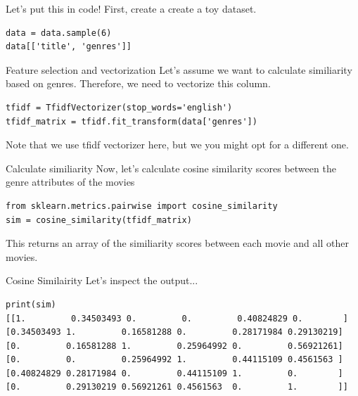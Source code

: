 \documentclass[handout]{beamer}
\begin{document}
\begin{frame}[fragile]{Let's put this in code!}
	\pause
	First, create a create a toy dataset.
	\pause
	\begin{verbatim}
data = data.sample(6)
data[['title', 'genres']]
	\end{verbatim}
	\pause
\end{frame}

\begin{frame}[fragile]{Feature selection and vectorization}
	Let's assume we want to calculate similiarity based on genres. Therefore, we need to vectorize this column. 
	\begin{verbatim}
tfidf = TfidfVectorizer(stop_words='english')
tfidf_matrix = tfidf.fit_transform(data['genres'])
	\end{verbatim}
	\pause
Note that we use \alert{tfidf vectorizer} here, but we you might opt for a different one. 
\end{frame}

\begin{frame}[fragile]{Calculate similiarity}
	Now, let's calculate cosine similarity scores between the genre attributes of the movies
	\begin{verbatim}
from sklearn.metrics.pairwise import cosine_similarity
sim = cosine_similarity(tfidf_matrix)
	\end{verbatim}
	\pause
This returns an array of the similiarity scores between each movie and all other movies. 
\end{frame}

\begin{frame}[fragile]{Cosine Similairity}
	Let's inspect the output...
\begin{verbatim}
print(sim)
[[1.         0.34503493 0.         0.         0.40824829 0.        ]
[0.34503493 1.         0.16581288 0.         0.28171984 0.29130219]
[0.         0.16581288 1.         0.25964992 0.         0.56921261]
[0.         0.         0.25964992 1.         0.44115109 0.4561563 ]
[0.40824829 0.28171984 0.         0.44115109 1.         0.        ]
[0.         0.29130219 0.56921261 0.4561563  0.         1.        ]]
\end{verbatim}
\end{frame}
\end{document}
